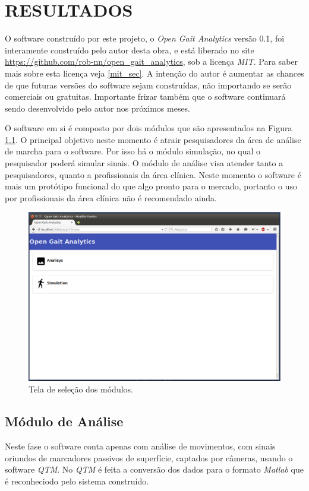 \chapter[RESULTADOS]{\textbf {RESULTADOS}}

O software construído por este projeto, o \emph{Open Gait Analytics} versão 0.1, foi interamente construído pelo autor desta obra, e está liberado no site \url{https://github.com/rob-nn/open_gait_analytics}, sob a licença \emph{MIT}. Para saber mais sobre esta licença veja \ref{mit_sec}.
A intenção do autor é aumentar as chances de que futuras versões do software sejam construídas, não importando se serão comerciais ou gratuitas.
Importante frizar também que o software continuará sendo desenvolvido pelo autor nos próximos meses.

O software em si é composto por dois módulos que são apresentados na Figura \ref{tela1}. O principal objetivo neste momento é atrair pesquisadores da área de análise de marcha para o software. Por isso há o módulo simulação, no qual o pesquisador poderá simular sinais.
O módulo de análise visa atender tanto a pesquisadores, quanto a profissionais da área clínica. Neste momento o software é mais um protótipo funcional do que algo pronto para o mercado, portanto o uso por profissionais da área clínica não é recomendado ainda.

\begin{figure}[ht]
	\centering
	\includegraphics[width=15cm]{figuras/tela1.eps}
	\caption{Tela de seleção dos módulos.}
	\label{tela1}
\end{figure}

\section{Módulo de Análise}
Neste fase o software conta apenas com análise de movimentos, com sinais oriundos de marcadores passivos de superfície, captados por câmeras, usando o software \emph{QTM}. 
No \emph{QTM} é feita a conversão dos dados para o formato \emph{Matlab} que é reconheciodo pelo sistema construído.

